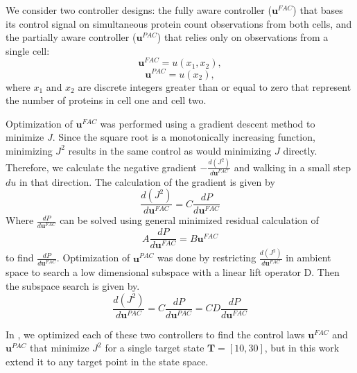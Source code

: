 \documentclass[12pt]{iopart}
\begin{document}
We consider two controller designs: the fully aware controller ($\mathbf{u}^{FAC}$) that bases its control signal on simultaneous protein count observations from both cells, and the partially aware controller ($\mathbf{u}^{PAC}$) that relies only on observations from a single cell:
\begin{equation}
\mathbf{u}^{FAC}=u(x_1,x_2),
\end{equation}
\begin{equation}
\mathbf{u}^{PAC}=u(x_2),
\end{equation}
where $x_1$ and $x_2$ are discrete integers greater than or equal to zero that represent the number of proteins in cell one and cell two. 

Optimization of $\mathbf{u}^{FAC}$ was performed using a gradient descent method to minimize $J$. Since the square root is a monotonically increasing function, minimizing $J^2$ results in the same control as would minimizing $J$ directly. Therefore, we calculate the negative gradient $-\frac{d(J^2)}{d\mathbf{u}^{FAC}}$ and walking in a small step $du$ in that direction. The calculation of the gradient is given by
\begin{equation}
\frac{d(J^2)}{d\mathbf{u}^{FAC}}=C \frac{dP}{d\mathbf{u}^{FAC}}
\end{equation}
Where $\frac{dP}{d\mathbf{u}^{FAC}}$ can be solved using general minimized residual calculation of
\begin{equation}
A \frac{dP}{d\mathbf{u}^{FAC}}=B \mathbf{u}^{FAC}
\end{equation}
to find $\frac{dP}{d\mathbf{u}^{FAC}}$.
Optimization of $\mathbf{u}^{PAC}$ was done by restricting $\frac{d(J^2)}{d\mathbf{u}^{FAC}}$ in ambient space to search a low dimensional subspace with a linear lift operator D. Then the subspace search is given by. 
\begin{equation}
\frac{d(J^2)}{d\mathbf{u}^{PAC}}=C \frac{dP}{d\mathbf{u}^{PAC}} = C D \frac{dP}{d\mathbf{u}^{FAC}}  
\end{equation}

In \cite{May2021}, we optimized each of these two controllers to find the control laws $\mathbf{u}^{FAC}$ and $\mathbf{u}^{PAC}$ that minimize $J^2$ for a single target state $\mathbf{T} = [10,30]$, but in this work extend it to any target point in the state space.
\end{document}

